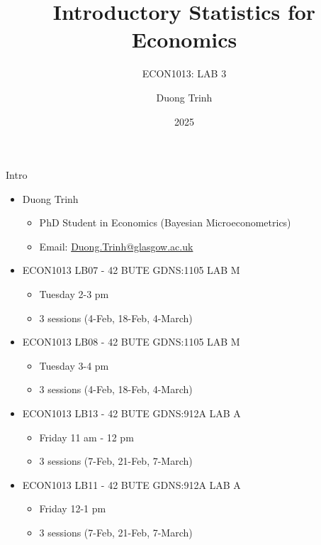 \documentclass[
  10pt,
  ignorenonframetext,
]{beamer}
\title{Introductory Statistics for Economics}
\subtitle{ECON1013: LAB 3}
\author{Duong Trinh}
\date{2025}
\institute{University of Glasgow}
\providecommand{\tightlist}{%
  \setlength{\itemsep}{0pt}\setlength{\parskip}{0pt}}
\begin{document}
\frame{\titlepage}

\begin{frame}{Intro}
\protect\hypertarget{intro}{}
\begin{itemize}
\tightlist
\item
  Duong Trinh

  \begin{itemize}
  \tightlist
  \item
    PhD Student in Economics (Bayesian Microeconometrics)
  \item
    Email: \underline{Duong.Trinh@glasgow.ac.uk}
  \end{itemize}
\end{itemize}

\vspace{2mm}

\begin{itemize}
\tightlist
\item
  ECON1013 LB07 - 42 BUTE GDNS:1105 LAB M

  \begin{itemize}
  \tightlist
  \item
    Tuesday 2-3 pm
  \item
    3 sessions (4-Feb, 18-Feb, 4-March)
  \end{itemize}
\item
  ECON1013 LB08 - 42 BUTE GDNS:1105 LAB M

  \begin{itemize}
  \tightlist
  \item
    Tuesday 3-4 pm
  \item
    3 sessions (4-Feb, 18-Feb, 4-March)
  \end{itemize}
\item
  ECON1013 LB13 - 42 BUTE GDNS:912A LAB A

  \begin{itemize}
  \tightlist
  \item
    Friday 11 am - 12 pm
  \item
    3 sessions (7-Feb, 21-Feb, 7-March)
  \end{itemize}
\item
  ECON1013 LB11 - 42 BUTE GDNS:912A LAB A

  \begin{itemize}
  \tightlist
  \item
    Friday 12-1 pm
  \item
    3 sessions (7-Feb, 21-Feb, 7-March)
  \end{itemize}
\end{itemize}

\vspace{3mm}
\end{frame}
\end{document}
